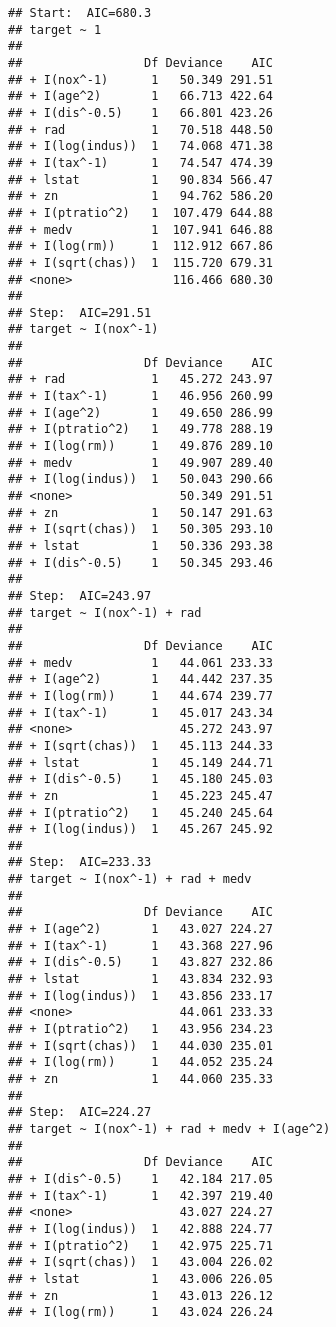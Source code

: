 \documentclass[
]{article}
\begin{document}
\begin{verbatim}
## Start:  AIC=680.3
## target ~ 1
## 
##                 Df Deviance    AIC
## + I(nox^-1)      1   50.349 291.51
## + I(age^2)       1   66.713 422.64
## + I(dis^-0.5)    1   66.801 423.26
## + rad            1   70.518 448.50
## + I(log(indus))  1   74.068 471.38
## + I(tax^-1)      1   74.547 474.39
## + lstat          1   90.834 566.47
## + zn             1   94.762 586.20
## + I(ptratio^2)   1  107.479 644.88
## + medv           1  107.941 646.88
## + I(log(rm))     1  112.912 667.86
## + I(sqrt(chas))  1  115.720 679.31
## <none>              116.466 680.30
## 
## Step:  AIC=291.51
## target ~ I(nox^-1)
## 
##                 Df Deviance    AIC
## + rad            1   45.272 243.97
## + I(tax^-1)      1   46.956 260.99
## + I(age^2)       1   49.650 286.99
## + I(ptratio^2)   1   49.778 288.19
## + I(log(rm))     1   49.876 289.10
## + medv           1   49.907 289.40
## + I(log(indus))  1   50.043 290.66
## <none>               50.349 291.51
## + zn             1   50.147 291.63
## + I(sqrt(chas))  1   50.305 293.10
## + lstat          1   50.336 293.38
## + I(dis^-0.5)    1   50.345 293.46
## 
## Step:  AIC=243.97
## target ~ I(nox^-1) + rad
## 
##                 Df Deviance    AIC
## + medv           1   44.061 233.33
## + I(age^2)       1   44.442 237.35
## + I(log(rm))     1   44.674 239.77
## + I(tax^-1)      1   45.017 243.34
## <none>               45.272 243.97
## + I(sqrt(chas))  1   45.113 244.33
## + lstat          1   45.149 244.71
## + I(dis^-0.5)    1   45.180 245.03
## + zn             1   45.223 245.47
## + I(ptratio^2)   1   45.240 245.64
## + I(log(indus))  1   45.267 245.92
## 
## Step:  AIC=233.33
## target ~ I(nox^-1) + rad + medv
## 
##                 Df Deviance    AIC
## + I(age^2)       1   43.027 224.27
## + I(tax^-1)      1   43.368 227.96
## + I(dis^-0.5)    1   43.827 232.86
## + lstat          1   43.834 232.93
## + I(log(indus))  1   43.856 233.17
## <none>               44.061 233.33
## + I(ptratio^2)   1   43.956 234.23
## + I(sqrt(chas))  1   44.030 235.01
## + I(log(rm))     1   44.052 235.24
## + zn             1   44.060 235.33
## 
## Step:  AIC=224.27
## target ~ I(nox^-1) + rad + medv + I(age^2)
## 
##                 Df Deviance    AIC
## + I(dis^-0.5)    1   42.184 217.05
## + I(tax^-1)      1   42.397 219.40
## <none>               43.027 224.27
## + I(log(indus))  1   42.888 224.77
## + I(ptratio^2)   1   42.975 225.71
## + I(sqrt(chas))  1   43.004 226.02
## + lstat          1   43.006 226.05
## + zn             1   43.013 226.12
## + I(log(rm))     1   43.024 226.24

\end{verbatim}
\end{document}
